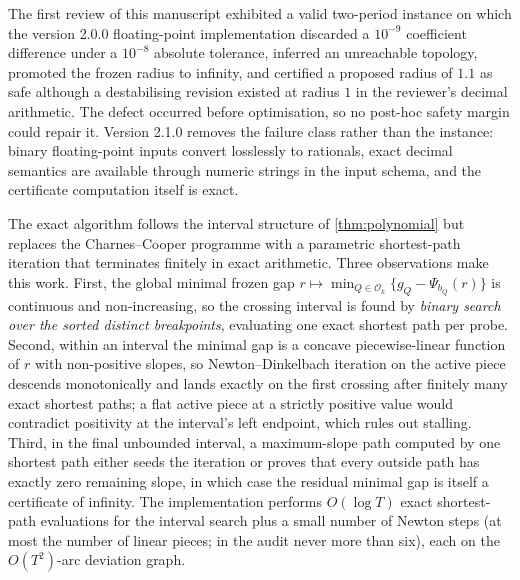 \documentclass[11pt]{article}
\theoremstyle{definition}
\newcommand{\cO}{\mathcal{O}}
\begin{document}
\begin{center}
\end{center}

The first review of this manuscript exhibited a valid two-period instance on which the version 2.0.0 floating-point implementation discarded a $10^{-9}$ coefficient difference under a $10^{-8}$ absolute tolerance, inferred an unreachable topology, promoted the frozen radius to infinity, and certified a proposed radius of $1.1$ as safe although a destabilising revision existed at radius $1$ in the reviewer's decimal arithmetic. The defect occurred before optimisation, so no post-hoc safety margin could repair it. Version 2.1.0 removes the failure class rather than the instance: binary floating-point inputs convert losslessly to rationals, exact decimal semantics are available through numeric strings in the input schema, and the certificate computation itself is exact.

The exact algorithm follows the interval structure of \cref{thm:polynomial} but replaces the Charnes--Cooper programme with a parametric shortest-path iteration that terminates finitely in exact arithmetic. Three observations make this work. First, the global minimal frozen gap $r\mapsto\min_{Q\in\cO_k}\{g_Q-\Psi_{b_Q}(r)\}$ is continuous and non-increasing, so the crossing interval is found by \emph{binary search over the sorted distinct breakpoints}, evaluating one exact shortest path per probe. Second, within an interval the minimal gap is a concave piecewise-linear function of $r$ with non-positive slopes, so Newton--Dinkelbach iteration on the active piece descends monotonically and lands exactly on the first crossing after finitely many exact shortest paths; a flat active piece at a strictly positive value would contradict positivity at the interval's left endpoint, which rules out stalling. Third, in the final unbounded interval, a maximum-slope path computed by one shortest path either seeds the iteration or proves that every outside path has exactly zero remaining slope, in which case the residual minimal gap is itself a certificate of infinity. The implementation performs $O(\log T)$ exact shortest-path evaluations for the interval search plus a small number of Newton steps (at most the number of linear pieces; in the audit never more than six), each on the $O(T^2)$-arc deviation graph.
\end{document}
